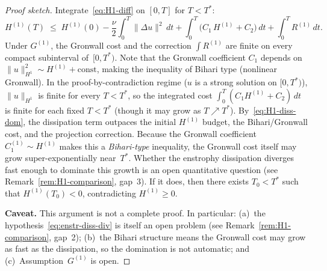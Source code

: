 \documentclass[12pt,a4paper]{article}
\theoremstyle{definition}
\theoremstyle{plain}
\theoremstyle{remark}
\begin{document}
\begin{proof}[Proof sketch]
Integrate~\eqref{eq:H1-diff} on $[0,T]$ for $T < T^*$:
\[
  H^{(1)}(T)
  \;\le\;
  H^{(1)}(0)
  - \frac{\nu}{2}\int_0^T\|\Delta u\|^2\,dt
  + \int_0^T\!\bigl(C_1\, H^{(1)} + C_2\bigr)\,dt
  + \int_0^T R^{(1)}\,dt.
\]
Under $G^{(1)}$, the Gronwall cost and the correction $\int R^{(1)}$
are finite on every compact subinterval of~$[0,T^*)$.
Note that the Gronwall coefficient $C_1$ depends on
$\|u\|_{H^1}^2 \sim H^{(1)} + \mathrm{const}$, making the
inequality of Bihari type (nonlinear Gronwall).  In the
proof-by-contradiction regime ($u$ is a strong solution on $[0,T^*)$),
$\|u\|_{H^1}$ is finite for every $T < T^*$, so the integrated cost
$\int_0^T(C_1 H^{(1)} + C_2)\,dt$ is finite for each fixed $T < T^*$
(though it may grow as $T \nearrow T^*$).
By~\eqref{eq:H1-diss-dom}, the dissipation term
outpaces the initial $H^{(1)}$ budget, the Bihari/Gronwall cost, and
the projection correction.  Because the Gronwall coefficient
$C_1^{(1)} \sim H^{(1)}$ makes this a \emph{Bihari-type}
inequality, the Gronwall cost itself may grow super-exponentially
near~$T^*$.  Whether the enstrophy dissipation diverges fast
enough to dominate this growth is an open quantitative question
(see Remark~\ref{rem:H1-comparison}, gap~3).  If it does, then
there exists $T_0 < T^*$ such that
$H^{(1)}(T_0) < 0$, contradicting $H^{(1)} \ge 0$.

\medskip\noindent
\textbf{Caveat.}\; This argument is not a complete proof.
In particular: (a)~the hypothesis~\eqref{eq:enstr-diss-div} is
itself an open problem (see Remark~\ref{rem:H1-comparison}, gap~2);
(b)~the Bihari structure means the Gronwall cost may grow as fast
as the dissipation, so the domination is not automatic; and
(c)~Assumption~$G^{(1)}$ is open.
\end{proof}
\end{document}
